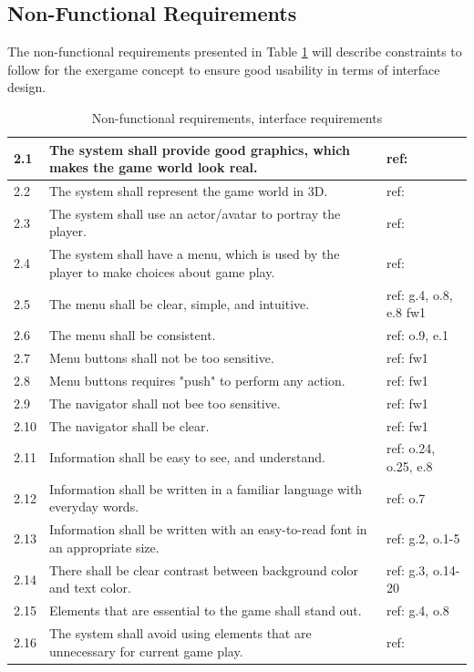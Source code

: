 \subsection{Non-Functional Requirements}
The non-functional requirements presented in Table \ref{tab:nfunc} will describe constraints to follow for the exergame concept to ensure good usability in terms of interface design.

\begin{table} [H]
\centering
\begin{tabular}{|>{\raggedright}p{}|p{}|p{2cm}|} 
\hline
2.1 & The system shall provide good graphics, which makes the game world look real. & ref: \cite{understandingvg} \\ \hline
2.2 & The system shall represent the game world in 3D. & ref: \cite{understandingvg}\\ \hline
2.3 & The system shall use an actor/avatar to portray the player. & ref: \cite{understandingvg}\\ \hline
2.4 & The system shall have a menu, which is used by the player to make choices about game play. & ref: \cite{gerling2} \\ \hline
2.5 & The menu shall be clear, simple, and intuitive. & ref: \cite{sweetser} g.4, o.8, e.8 fw1 \\ \hline
2.6 & The menu shall be consistent. & ref: o.9, e.1 \\ \hline
2.7 & Menu buttons shall not be too sensitive. & ref: fw1 \\ \hline
2.8 & Menu buttons requires "push" to perform any action. & ref: fw1\\ \hline
2.9 & The navigator shall not bee too sensitive. & ref: fw1\\ \hline
2.10 & The navigator shall be clear. & ref: fw1\\ \hline
2.11 & Information shall be easy to see, and understand. & ref: o.24, o.25, e.8\\ \hline
2.12 & Information shall be written in a familiar language with everyday words. & ref: o.7\\ \hline
2.13 & Information shall be written with an easy-to-read font in an appropriate size. & ref: g.2, o.1-5 \\ \hline
2.14 & There shall be clear contrast between background color and text color. & ref: g.3, o.14-20 \\ \hline
2.15 & Elements that are essential to the game shall stand out. & ref: g.4, o.8\\ \hline
2.16 & The system shall avoid using elements that are unnecessary for current game play.  & ref: \cite{sweetser}\\ \hline
\end{tabular}
\caption[Non-functional requirements]{Non-functional requirements, interface requirements}
\label{tab:nfunc}
\end{table} 

